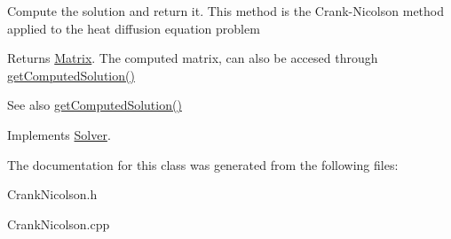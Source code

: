 Compute the solution and return it. This method is the Crank-\/\+Nicolson method applied to the heat diffusion equation problem \begin{DoxyReturn}{Returns}
\mbox{\hyperlink{classMatrix}{Matrix}}. The computed matrix, can also be accesed through \mbox{\hyperlink{classSolver_aafe88ce4130c001052e5d93c1681f90f}{get\+Computed\+Solution()}} 
\end{DoxyReturn}
\begin{DoxySeeAlso}{See also}
\mbox{\hyperlink{classSolver_aafe88ce4130c001052e5d93c1681f90f}{get\+Computed\+Solution()}} 
\end{DoxySeeAlso}


Implements \mbox{\hyperlink{classSolver_a0f4ecfaed825407019995b5176e25748}{Solver}}.



The documentation for this class was generated from the following files\+:\begin{DoxyCompactItemize}
\item 
Crank\+Nicolson.\+h\item 
Crank\+Nicolson.\+cpp\end{DoxyCompactItemize}
